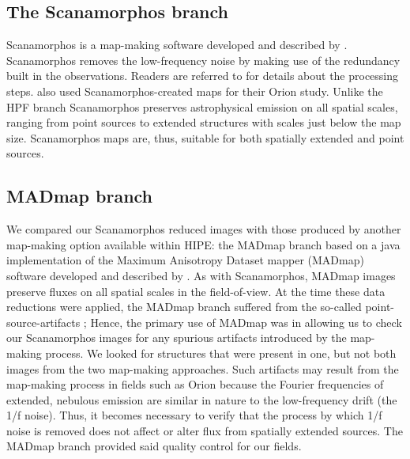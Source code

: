 \documentclass[manuscript]{aastex}
\begin{document}
\subsection{The Scanamorphos branch}
\par
Scanamorphos is a map-making software developed and described by \cite{scanamorphos}.  Scanamorphos removes the low-frequency noise by making use of the redundancy built in the observations.  Readers are referred to \cite{scanamorphos} for details about the processing steps.   \citet{pbrpaper} also used Scanamorphos-created maps for their Orion study.  Unlike the HPF branch Scanamorphos preserves astrophysical emission on all spatial scales, ranging from point sources to extended structures with scales just below the map size.   Scanamorphos maps are, thus, suitable for both spatially extended and point sources.

\subsection{MADmap branch}
\par
We compared our Scanamorphos reduced images with those produced by another map-making option available within HIPE: the MADmap branch based on a java implementation of the Maximum Anisotropy Dataset mapper (MADmap) software developed and described by \citet{madmap}.  As with Scanamorphos, MADmap images preserve fluxes on all spatial scales in the field-of-view.  At the time these data reductions were applied, the MADmap branch suffered from the so-called point-source-artifacts \citep{madarts}; Hence, the primary use of MADmap was in allowing us to check our Scanamorphos images for any spurious artifacts introduced by the map-making process.  We looked for structures that were present in one, but not both images from the two map-making approaches.  Such artifacts may result from the map-making process in fields such as Orion because the Fourier frequencies of extended, nebulous emission are similar in nature to  the low-frequency drift (the 1/f noise).  Thus, it becomes necessary to verify that the process by which 1/f noise is removed does not affect or alter flux from spatially extended sources.  The MADmap branch provided said quality control for our fields.
\end{document}
